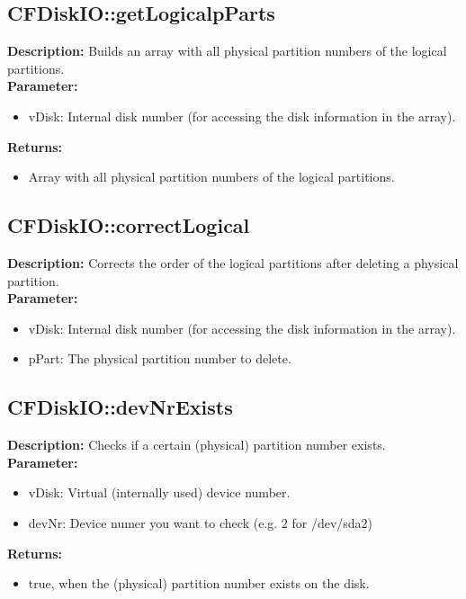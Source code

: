 \subsection{CFDiskIO::getLogicalpParts}
\textbf{Description:} Builds an array with all physical partition numbers of the logical partitions.\\
\textbf{Parameter:}
\begin{itemize}
\item vDisk: Internal disk number (for accessing the disk information in the array).
\end{itemize}
\textbf{Returns:}
\begin{itemize}
\item Array with all physical partition numbers of the logical partitions.
\end{itemize}

\subsection{CFDiskIO::correctLogical}
\textbf{Description:} Corrects the order of the logical partitions after deleting a physical partition.\\
\textbf{Parameter:}
\begin{itemize}
\item vDisk: Internal disk number (for accessing the disk information in the array).
\item pPart: The physical partition number to delete.
\end{itemize}

\subsection{CFDiskIO::devNrExists}
\textbf{Description:} Checks if a certain (physical) partition number exists.\\
\textbf{Parameter:}
\begin{itemize}
\item vDisk: Virtual (internally used) device number.
\item devNr: Device numer you want to check (e.g. 2 for /dev/sda2)
\end{itemize}
\textbf{Returns:}
\begin{itemize}
\item true, when the (physical) partition number exists on the disk.
\end{itemize}

